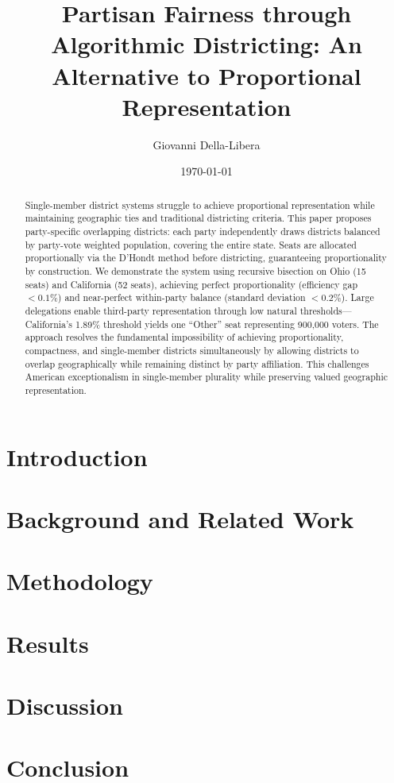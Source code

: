 \documentclass[11pt]{article}
\title{Partisan Fairness through Algorithmic Districting: An Alternative to Proportional Representation}
\author{Giovanni Della-Libera}
\date{\today}
\begin{document}
\maketitle

\begin{abstract}
Single-member district systems struggle to achieve proportional representation while maintaining geographic ties and traditional districting criteria. This paper proposes party-specific overlapping districts: each party independently draws districts balanced by party-vote weighted population, covering the entire state. Seats are allocated proportionally via the D'Hondt method before districting, guaranteeing proportionality by construction. We demonstrate the system using recursive bisection on Ohio (15 seats) and California (52 seats), achieving perfect proportionality (efficiency gap $< 0.1\%$) and near-perfect within-party balance (standard deviation $< 0.2\%$). Large delegations enable third-party representation through low natural thresholds---California's 1.89\% threshold yields one ``Other'' seat representing 900,000 voters. The approach resolves the fundamental impossibility of achieving proportionality, compactness, and single-member districts simultaneously by allowing districts to overlap geographically while remaining distinct by party affiliation. This challenges American exceptionalism in single-member plurality while preserving valued geographic representation.
\end{abstract}

\section{Introduction}


\section{Background and Related Work}


\section{Methodology}


\section{Results}


\section{Discussion}


\section{Conclusion}



\end{document}
